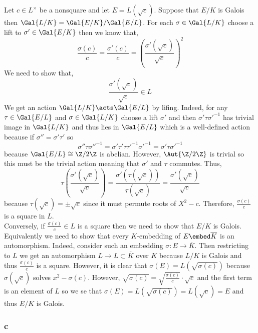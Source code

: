 \documentclass[12pt]{article}
\begin{document}
Let $c \in L^\times$ be a nonsquare and let $E = L(\sqrt{c})$. Suppose that $E / K$ is Galois then $\Gal{L/K} = \Gal{E/K} / \Gal{E/L}$. For each $\sigma \in \Gal{L/K}$ choose a lift to $\sigma' \in \Gal{E/K}$ then we know that,
\[ \frac{\sigma(c)}{c} = \frac{\sigma'(c)}{c} = \left( \frac{\sigma'(\sqrt{c})}{\sqrt{c}} \right)^2 \]
We need to show that,
\[ \frac{\sigma'(\sqrt{c})}{\sqrt{c}} \in L \]
We get an action $\Gal{L/K} \acts \Gal{E/L}$ by lifing. Indeed, for any $\tau \in \Gal{E/L}$ and $\sigma \in \Gal{L/K}$ choose a lift $\sigma'$ and then $\sigma' \tau \sigma'^{-1}$ has trivial image in $\Gal{L/K}$ and thus lies in $\Gal{E/L}$ which is a well-defined action because if $\sigma'' = \sigma' \tau'$ so 
\[ \sigma'' \tau \sigma''^{-1} = \sigma' \tau' \tau \tau'^{-1} \sigma'^{-1} = \sigma' \tau \sigma'^{-1} \]
because $\Gal{E/L} \cong \Z/2\Z$ is abelian. However, $\Aut{\Z/ 2 \Z}$ is trivial so this must be the trivial action meaning that $\sigma'$ and $\tau$ commutes. Thus,
\[ \tau \left( \frac{\sigma'(\sqrt{c})}{\sqrt{c}} \right) = \frac{\sigma'(\tau(\sqrt{c}))}{\tau(\sqrt{c})} = \frac{\sigma'(\sqrt{c})}{\sqrt{c}} \]
because $\tau(\sqrt{c}) = \pm \sqrt{c}$ since it must permute roots of $X^2 - c$. Therefore, $\frac{\sigma(c)}{c}$ is a square in $L$.
\bigskip\\
Conversely, if $\frac{\sigma(c)}{c} \in L$ is a square then we need to show that $E / K$ is Galois. Equivalently we need to show that every $K$-embedding of $E \embed \overline{K}$ is an automorphism. Indeed, consider such an embedding $\sigma : E \to \overline{K}$. Then restricting to $L$ we get an automorphism $L \to L \subset \overline{K}$ over $K$ because $L/K$ is Galois and thus $\frac{\sigma(c)}{c}$ is a square. However, it is clear that $\sigma(E) = L(\sqrt{\sigma(c)})$ because $\sigma(\sqrt{c})$ solves $x^2 - \sigma(c)$. However, $\sqrt{\sigma(c)} = \sqrt{\frac{\sigma(c)}{c}} \cdot \sqrt{c}$ and the first term is an element of $L$ so we se that $\sigma(E) = L(\sqrt{\sigma(c)}) = L(\sqrt{c}) = E$ and thus $E / K$ is Galois.

\subsubsection{c}
\end{document}
